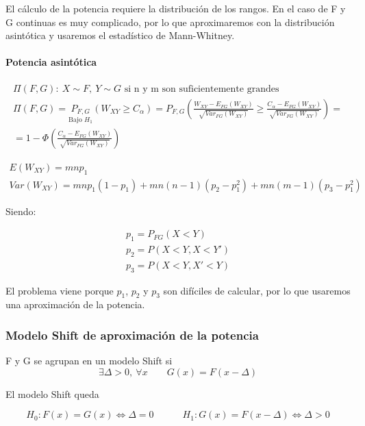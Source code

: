 El cálculo de la potencia requiere la distribución de los rangos. En el caso de F y G continuas es muy complicado, por lo que aproximaremos con la distribución asintótica y usaremos el estadístico de Mann-Whitney.

\paragraph{Potencia asintótica}

$$
\begin{array}{c}
    \Pi(F,G):\ X\sim F,\ Y\sim G\text{ si n y m son suficientemente grandes} \\
    \Pi(F,G)=\underset{\text{Bajo }H_1}{P_{F,G}}(W_{XY}\geq C_\alpha)=P_{F,G}\left(\frac{W_{XY}-E_{FG}(W_{XY})}{\sqrt{Var_{FG}(W_{XY})}}\geq \frac{C_\alpha-E_{FG}(W_{XY})}{\sqrt{Var_{FG}(W_{XY})}}\right)=\\
    =1-\Phi\left(\frac{C_\alpha-E_{FG}(W_{XY})}{\sqrt{Var_{FG}(W_{XY})}}\right)
\end{array}
$$

$$
\begin{array}{c}
    E(W_{XY})=mnp_1\\
    Var(W_{XY})=mnp_1(1-p_1)+mn(n-1)(p_2-p_1^2)+mn(m-1)(p_3-p_1^2)
\end{array}
$$

Siendo:

$$
\begin{array}{c}
    p_1=P_{FG}(X<Y)\\
    p_2=P(X<Y,X<Y')\\
    p_3=P(X<Y,X'<Y)
\end{array}
$$

El problema viene porque $p_1$, $p_2$ y $p_3$ son difíciles de calcular, por lo que usaremos una aproximación de la potencia.

\subsubsection{Modelo Shift de aproximación de la potencia}

\begin{theorem}
    F y G se agrupan en un modelo Shift si
    $$
    \exists\Delta>0,\ \forall x\quad\quad G(x)=F(x-\Delta)
    $$
\end{theorem}

El modelo Shift queda

$$
H_0:F(x)=G(x)\iff\Delta=0\quad\quad\quad H_1:G(x)=F(x-\Delta)\iff\Delta>0
$$

